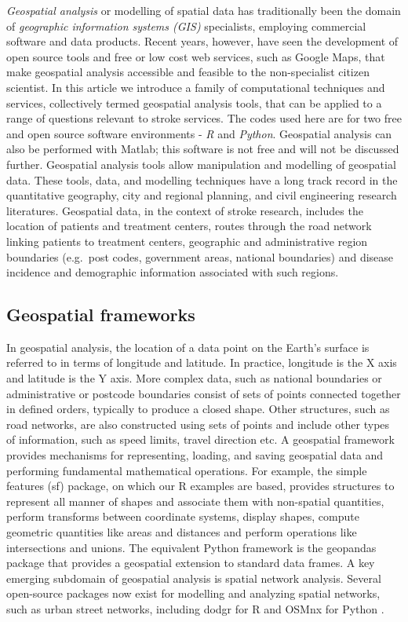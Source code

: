 \documentclass[utf8]{frontiersHLTH}
\begin{document}
{\em Geospatial analysis} or modelling of spatial data has
traditionally been the domain of {\em geographic information systems
  (GIS)} specialists, employing commercial software and data
products. Recent years, however, have seen the development of open
source tools and free or low cost web services, such as Google Maps,
that make geospatial analysis accessible and feasible to the
non-specialist citizen scientist. In this article we introduce a
family of computational techniques and services, collectively termed
geospatial analysis tools, that can be applied to a range of questions
relevant to stroke services. The codes used here are for two free
and open source software environments - {\em R} and  {\em Python}. Geospatial analysis
can also be performed with Matlab\cite{Milne_2017}; this software is not free and
will not be discussed further. Geospatial analysis tools allow
manipulation and modelling of geospatial data. These tools, data, and
modelling techniques have a long track record in the quantitative
geography, city and regional planning, and civil engineering research
literatures. Geospatial data, in the context of stroke research,
includes the location of patients and treatment centers, routes
through the road network linking patients to treatment centers,
geographic and administrative region boundaries (e.g.~post codes,
government areas, national boundaries) and disease incidence and
demographic information associated with such regions.

\subsection{Geospatial frameworks}\label{geospatial-frameworks} 
In geospatial analysis, the location of a data point on the Earth's surface is referred
to in terms of longitude and latitude. In practice, longitude is the X
axis and latitude is the Y axis. More complex data, such as national
boundaries or administrative or postcode boundaries consist of sets of
points connected together in defined orders, typically to produce a
closed shape. Other structures, such as road networks, are also
constructed using sets of points and include other types of
information, such as speed limits, travel direction etc. A geospatial
framework provides mechanisms for representing, loading, and saving
geospatial data and performing fundamental mathematical
operations. For example, the simple features (sf) \cite{Pebesma_2018}
package, on which our R examples are based, provides structures to
represent all manner of shapes and associate them with non-spatial
quantities, perform transforms between coordinate systems, display
shapes, compute geometric quantities like areas and distances and
perform operations like intersections and unions. The equivalent
Python framework is the geopandas package that provides a geospatial
extension to standard data frames. A key emerging subdomain of
geospatial analysis is spatial network analysis. Several open-source
packages now exist for modelling and analyzing spatial networks, such
as urban street networks, including dodgr for R \cite{Padgham_2019}
and OSMnx for Python \cite{boeing_osmnx_2017}.
\end{document}
